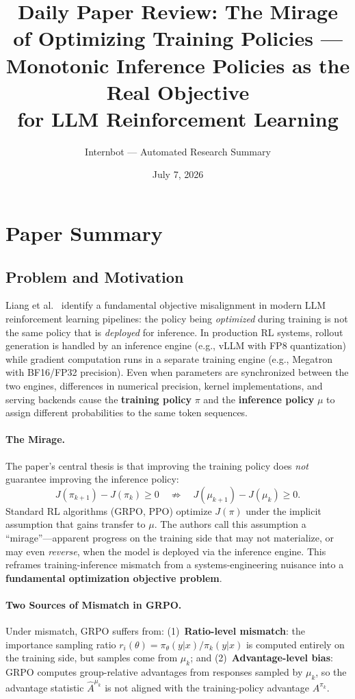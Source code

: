 \documentclass[11pt,a4paper]{article}
\title{Daily Paper Review: The Mirage of Optimizing Training Policies ---\\Monotonic Inference Policies as the Real Objective\\for LLM Reinforcement Learning}
\author{Internbot --- Automated Research Summary}
\date{July 7, 2026}
\begin{document}
\maketitle

\section{Paper Summary}

\subsection{Problem and Motivation}

Liang et al.~\cite{liang2026mirage} identify a fundamental objective misalignment in modern LLM reinforcement learning pipelines: the policy being \emph{optimized} during training is not the same policy that is \emph{deployed} for inference. In production RL systems, rollout generation is handled by an inference engine (e.g., vLLM with FP8 quantization) while gradient computation runs in a separate training engine (e.g., Megatron with BF16/FP32 precision). Even when parameters are synchronized between the two engines, differences in numerical precision, kernel implementations, and serving backends cause the \textbf{training policy} $\pi$ and the \textbf{inference policy} $\mu$ to assign different probabilities to the same token sequences.

\paragraph{The Mirage.} The paper's central thesis is that improving the training policy does \emph{not} guarantee improving the inference policy:
\[
J(\pi_{k+1}) - J(\pi_k) \geq 0 \quad \not\Rightarrow \quad J(\mu_{k+1}) - J(\mu_k) \geq 0.
\]
Standard RL algorithms (GRPO, PPO) optimize $J(\pi)$ under the implicit assumption that gains transfer to $\mu$. The authors call this assumption a ``mirage''---apparent progress on the training side that may not materialize, or may even \emph{reverse}, when the model is deployed via the inference engine. This reframes training-inference mismatch from a systems-engineering nuisance into a \textbf{fundamental optimization objective problem}.

\paragraph{Two Sources of Mismatch in GRPO.} Under mismatch, GRPO suffers from: (1)~\textbf{Ratio-level mismatch}: the importance sampling ratio $r_i(\theta) = \pi_\theta(y|x) / \pi_k(y|x)$ is computed entirely on the training side, but samples come from $\mu_k$; and (2)~\textbf{Advantage-level bias}: GRPO computes group-relative advantages from responses sampled by $\mu_k$, so the advantage statistic $\hat{A}^{\mu_k}$ is not aligned with the training-policy advantage $A^{\pi_k}$.
\end{document}
